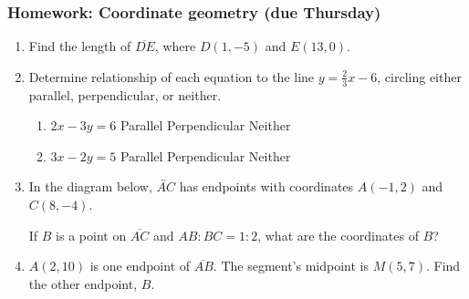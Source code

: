 \documentclass[12pt, twoside]{article}
\begin{document}
\subsubsection*{Homework: Coordinate geometry (due Thursday)}
 \begin{enumerate}

   \item Find the length of $\overline{DE}$, where $D(1,-5)$ and $E(13,0)$.
       \vspace{4cm}

   \item Determine relationship of each equation to the line  $y=\frac{2}{3} x-6$, circling either parallel, perpendicular, or neither.
     \begin{enumerate}
       \item $2x-3y=6$ \hspace{1cm} Parallel \qquad Perpendicular \qquad Neither
       \vspace{1.5cm}
       \item $3x-2y=5$ \hspace{1cm} Parallel \qquad Perpendicular \qquad Neither
       \vspace{2.cm}
     \end{enumerate}

  \item In the diagram below, $\overleftrightarrow{AC}$ has endpoints with coordinates $A(-1,2)$ and $C(8, -4)$.
    \begin{center} %
    \end{center}
    If $B$ is a point on $\overline{AC}$ and $AB {:} BC = 1{:}2$,  what  are  the  coordinates of $B$?

\newpage

\item $A(2,10)$ is one endpoint of $\overline{AB}$. The segment's midpoint is $M(5,7)$. Find the other endpoint, $B$. \vspace{4cm}


\end{enumerate}
\end{document}
